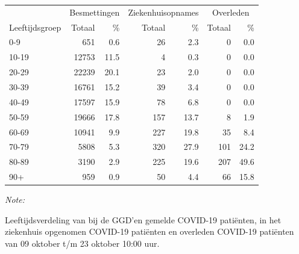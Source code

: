 \documentclass[
  english,
  man,floatsintext]{apa6}
\begin{document}
\begin{table}[H]
\centering\begingroup\fontsize{11}{13}\selectfont

\begin{threeparttable}
\begin{tabular}{lrrrrrr}
\toprule
\multicolumn{1}{c}{ } & \multicolumn{2}{c}{Besmettingen} & \multicolumn{2}{c}{Ziekenhuisopnames} & \multicolumn{2}{c}{Overleden} \\
\cmidrule(l{3pt}r{3pt}){2-3} \cmidrule(l{3pt}r{3pt}){4-5} \cmidrule(l{3pt}r{3pt}){6-7}
Leeftijdsgroep & Totaal & \% & Totaal & \% & Totaal & \%\\
\midrule
0-9 & 651 & 0.6 & 26 & 2.3 & 0 & 0.0\\
10-19 & 12753 & 11.5 & 4 & 0.3 & 0 & 0.0\\
20-29 & 22239 & 20.1 & 23 & 2.0 & 0 & 0.0\\
30-39 & 16761 & 15.2 & 39 & 3.4 & 0 & 0.0\\
40-49 & 17597 & 15.9 & 78 & 6.8 & 0 & 0.0\\
50-59 & 19666 & 17.8 & 157 & 13.7 & 8 & 1.9\\
60-69 & 10941 & 9.9 & 227 & 19.8 & 35 & 8.4\\
70-79 & 5808 & 5.3 & 320 & 27.9 & 101 & 24.2\\
80-89 & 3190 & 2.9 & 225 & 19.6 & 207 & 49.6\\
90+ & 959 & 0.9 & 50 & 4.4 & 66 & 15.8\\
\bottomrule
\end{tabular}
\begin{tablenotes}
\item \textit{Note: } 
\item Leeftijdsverdeling van bij de GGD’en gemelde COVID-19 patiënten, in het ziekenhuis opgenomen COVID-19 patiënten en overleden COVID-19 patiënten van 09 oktober t/m 23 oktober 10:00 uur.
\end{tablenotes}
\end{threeparttable}
\endgroup{}
\end{table}
\end{document}
